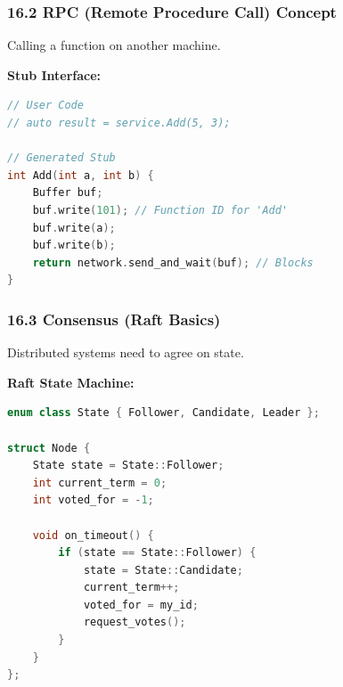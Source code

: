 \hypertarget{rpc-remote-procedure-call-concept}{%
\subsubsection{16.2 RPC (Remote Procedure Call)
Concept}\label{rpc-remote-procedure-call-concept}}

Calling a function on another machine.

\textbf{Stub Interface:}

\begin{lstlisting}[language={C++}]
// User Code
// auto result = service.Add(5, 3);

// Generated Stub
int Add(int a, int b) {
    Buffer buf;
    buf.write(101); // Function ID for 'Add'
    buf.write(a);
    buf.write(b);
    return network.send_and_wait(buf); // Blocks
}
\end{lstlisting}

\hypertarget{consensus-raft-basics}{%
\subsubsection{16.3 Consensus (Raft
Basics)}\label{consensus-raft-basics}}

Distributed systems need to agree on state.

\textbf{Raft State Machine:}

\begin{lstlisting}[language={C++}]
enum class State { Follower, Candidate, Leader };

struct Node {
    State state = State::Follower;
    int current_term = 0;
    int voted_for = -1;

    void on_timeout() {
        if (state == State::Follower) {
            state = State::Candidate;
            current_term++;
            voted_for = my_id;
            request_votes();
        }
    }
};
\end{lstlisting}
